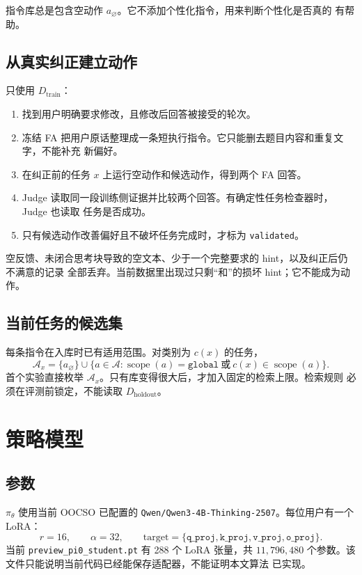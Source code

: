 \documentclass[11pt,UTF8,fontset=fandol]{ctexart}
\newcommand{\Dtrain}{D_{\mathrm{train}}}
\newcommand{\Dholdout}{D_{\mathrm{holdout}}}
\newcommand{\policy}{\pi_{\theta}}
\begin{document}
指令库总是包含空动作 \(a_{\varnothing}\)。它不添加个性化指令，用来判断个性化是否真的
有帮助。

\subsection{从真实纠正建立动作}

只使用 \(\Dtrain\)：
\begin{enumerate}
  \item 找到用户明确要求修改，且修改后回答被接受的轮次。
  \item 冻结 FA 把用户原话整理成一条短执行指令。它只能删去题目内容和重复文字，不能补充
    新偏好。
  \item 在纠正前的任务 \(x\) 上运行空动作和候选动作，得到两个 FA 回答。
  \item Judge 读取同一段训练侧证据并比较两个回答。有确定性任务检查器时，Judge 也读取
    任务是否成功。
  \item 只有候选动作改善偏好且不破坏任务完成时，才标为 \texttt{validated}。
\end{enumerate}

空反馈、未闭合思考块导致的空文本、少于一个完整要求的 hint，以及纠正后仍不满意的记录
全部丢弃。当前数据里出现过只剩``和''的损坏 hint；它不能成为动作。

\subsection{当前任务的候选集}

每条指令在入库时已有适用范围。对类别为 \(c(x)\) 的任务，
\begin{equation}
  \mathcal A_x
  =
  \{a_{\varnothing}\}
  \cup
  \{a\in\mathcal A:
    \operatorname{scope}(a)=\texttt{global}
    \ \text{或}\ c(x)\in\operatorname{scope}(a)\}.
  \label{eq:candidates}
\end{equation}
首个实验直接枚举 \(\mathcal A_x\)。只有库变得很大后，才加入固定的检索上限。检索规则
必须在评测前锁定，不能读取 \(\Dholdout\)。

\section{策略模型}

\subsection{参数}

\(\policy\) 使用当前 OOCSO 已配置的
\texttt{Qwen/Qwen3-4B-Thinking-2507}。每位用户有一个 LoRA：
\[
  r=16,\qquad
  \alpha=32,\qquad
  \text{target}=
  \{\texttt{q\_proj},\texttt{k\_proj},
    \texttt{v\_proj},\texttt{o\_proj}\}.
\]
当前 \texttt{preview\_pi0\_student.pt} 有 288 个 LoRA 张量，共
\(11{,}796{,}480\) 个参数。该文件只能说明当前代码已经能保存适配器，不能证明本文算法
已实现。
\end{document}
